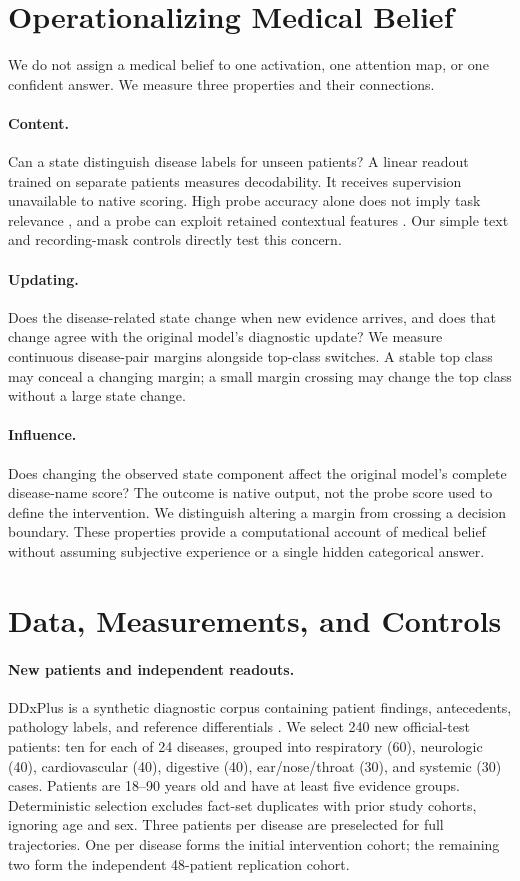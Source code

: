 \documentclass[11pt]{article}
\begin{document}
\section{Operationalizing Medical Belief}
We do not assign a medical belief to one activation, one attention map, or one confident answer. We measure three properties and their connections.

\paragraph{Content.} Can a state distinguish disease labels for unseen patients? A linear readout trained on separate patients measures decodability. It receives supervision unavailable to native scoring. High probe accuracy alone does not imply task relevance \citep{probing}, and a probe can exploit retained contextual features \citep{contextprobe}. Our simple text and recording-mask controls directly test this concern.

\paragraph{Updating.} Does the disease-related state change when new evidence arrives, and does that change agree with the original model's diagnostic update? We measure continuous disease-pair margins alongside top-class switches. A stable top class may conceal a changing margin; a small margin crossing may change the top class without a large state change.

\paragraph{Influence.} Does changing the observed state component affect the original model's complete disease-name score? The outcome is native output, not the probe score used to define the intervention. We distinguish altering a margin from crossing a decision boundary. These properties provide a computational account of medical belief without assuming subjective experience or a single hidden categorical answer.

\section{Data, Measurements, and Controls}
\paragraph{New patients and independent readouts.}
DDxPlus is a synthetic diagnostic corpus containing patient findings, antecedents, pathology labels, and reference differentials \citep{ddxplus}. We select 240 new official-test patients: ten for each of 24 diseases, grouped into respiratory (60), neurologic (40), cardiovascular (40), digestive (40), ear/nose/throat (30), and systemic (30) cases. Patients are 18--90 years old and have at least five evidence groups. Deterministic selection excludes fact-set duplicates with prior study cohorts, ignoring age and sex. Three patients per disease are preselected for full trajectories. One per disease forms the initial intervention cohort; the remaining two form the independent 48-patient replication cohort.
\end{document}
